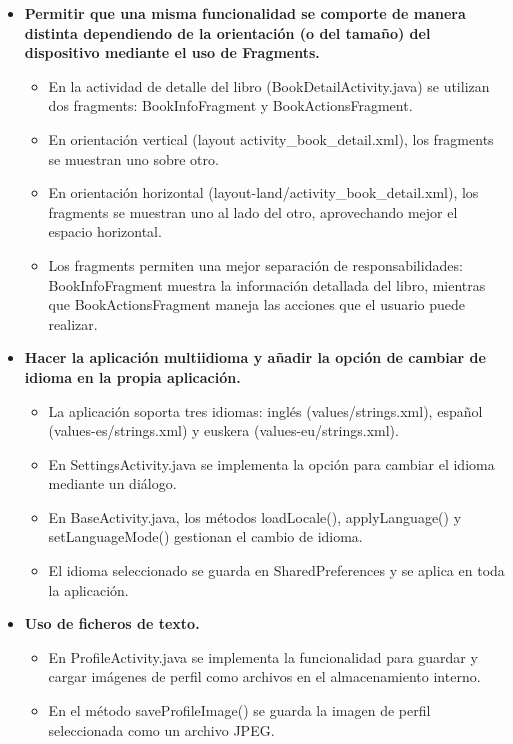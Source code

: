 \documentclass[a4paper,12pt]{report}
\begin{document}
      \begin{itemize}
        \item \textbf{Permitir que una misma funcionalidad se comporte de manera distinta dependiendo de la orientación (o del tamaño) del dispositivo mediante el uso de Fragments.}
        \begin{itemize}
          \item En la actividad de detalle del libro (BookDetailActivity.java) se utilizan dos fragments: BookInfoFragment y BookActionsFragment.
          \item En orientación vertical (layout activity\_book\_detail.xml), los fragments se muestran uno sobre otro.
          \item En orientación horizontal (layout-land/activity\_book\_detail.xml), los fragments se muestran uno al lado del otro, aprovechando mejor el espacio horizontal.
          \item Los fragments permiten una mejor separación de responsabilidades: BookInfoFragment muestra la información detallada del libro, mientras que BookActionsFragment maneja las acciones que el usuario puede realizar.
        \end{itemize}
        \item \textbf{Hacer la aplicación multiidioma y añadir la opción de cambiar de idioma en la propia aplicación.}
        \begin{itemize}
          \item La aplicación soporta tres idiomas: inglés (values/strings.xml), español (values-es/strings.xml) y euskera (values-eu/strings.xml).
          \item En SettingsActivity.java se implementa la opción para cambiar el idioma mediante un diálogo.
          \item En BaseActivity.java, los métodos loadLocale(), applyLanguage() y setLanguageMode() gestionan el cambio de idioma.
          \item El idioma seleccionado se guarda en SharedPreferences y se aplica en toda la aplicación.
        \end{itemize}
        \item \textbf{Uso de ficheros de texto.}
        \begin{itemize}
          \item En ProfileActivity.java se implementa la funcionalidad para guardar y cargar imágenes de perfil como archivos en el almacenamiento interno.
          \item En el método saveProfileImage() se guarda la imagen de perfil seleccionada como un archivo JPEG.

\end{itemize}
\end{itemize}
\end{document}
